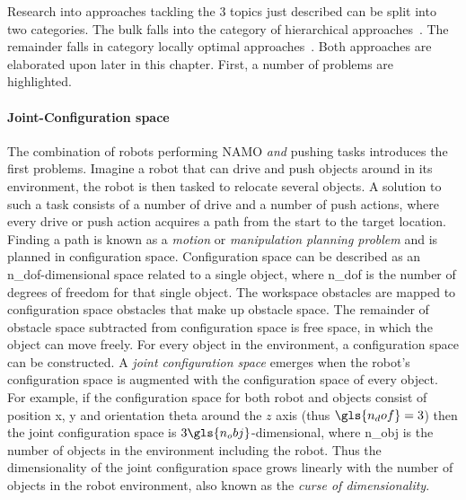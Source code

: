 Research into approaches tackling the 3 topics just described can be split into two categories. The bulk falls into the category of hierarchical approaches~\cite{ellis_navigation_2022,krontiris_dealing_2015,scholz_navigation_2016,vega-brown_asymptotically_2020,wang_affordancebased_2020}. The remainder falls in category locally optimal approaches~\cite{novin_dynamic_2018,sabbaghnovin_optimal_2016,sabbaghnovin_model_2021}. Both approaches are elaborated upon later in this chapter. First, a number of problems are highlighted.\bs

\paragraph{Joint-Configuration space}
The combination of robots performing \ac{NAMO} \textit{and} pushing tasks introduces the first problems. Imagine a robot that can drive and push objects around in its environment, the robot is then tasked to relocate several objects. A solution to such a task consists of a number of drive and a number of push actions, where every drive or push action acquires a path from the start to the target location. Finding a path is known as a \textit{motion} or \textit{manipulation planning problem} and is planned in configuration space. Configuration space can be described as an \gls{n_dof}-dimensional space related to a single object, where \gls{n_dof} is the number of degrees of freedom for that single object. The workspace obstacles are mapped to configuration space obstacles that make up obstacle space. The remainder of obstacle space subtracted from configuration space is free space, in which the object can move freely. For every object in the environment, a configuration space can be constructed. A \textit{joint configuration space} emerges when the robot's configuration space is augmented with the configuration space of every object. For example, if the configuration space for both robot and objects consist of position \gls{x}, \gls{y} and orientation \gls{theta} around the $z$ axis (thus $\gls{n_dof}=3$) then the joint configuration space is $3\gls{n_obj}$-dimensional, where \gls{n_obj} is the number of objects in the environment including the robot. Thus the dimensionality of the joint configuration space grows linearly with the number of objects in the robot environment, also known as the \textit{curse of dimensionality}.\bs

